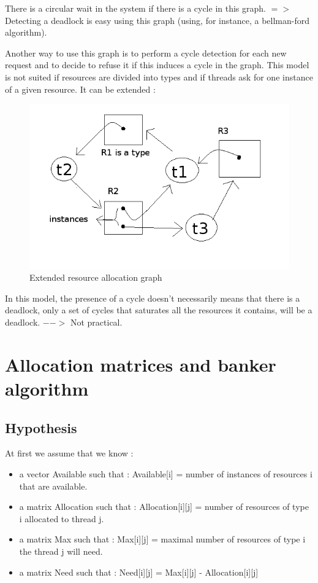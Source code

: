 \documentclass[a4paper,10pt]{article}
\begin{document}
There is a circular wait in the system if there is a cycle in this graph.
$=>$ Detecting a deadlock is easy using this graph (using, for instance, a bellman-ford algorithm).

Another way to use this graph is to perform a cycle detection for each new request and to decide to refuse it if this induces a cycle in the graph.
This model is not suited if resources are divided into types and if threads ask for one instance of a given resource.
It can be extended :

\begin{figure}[h]
  \begin{center}
    \includegraphics[scale=0.6]{resource_graph_extended}
    \caption{Extended resource allocation graph}
  \end{center}
\end{figure}

In this model, the presence of a cycle doesn't necessarily means that there is a deadlock, only a set of cycles that saturates all the resources it contains, will be a deadlock. $-->$ Not practical.

\section{Allocation matrices and banker algorithm}

\subsection{Hypothesis}

At first we assume that we know :

\begin{itemize}
  \item a vector Available such that : Available[i] = number of instances of resources i that are available.
  \item a matrix Allocation such that : Allocation[i][j] = number of resources of type i allocated to thread j.
  \item a matrix Max such that : Max[i][j] = maximal number of resources of type i the thread j will need.
  \item a matrix Need such that : Need[i][j] = Max[i][j] - Allocation[i][j]
\end{itemize}
\end{document}
